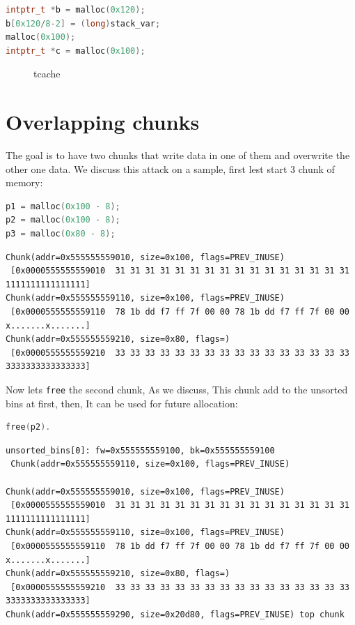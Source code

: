 \documentclass{masterthesis}
\newcommand*\tch{tcache}
\newcommand*\ub{unsorted bins}
\begin{document}
\begin{lstlisting}[language=c,frame=tlrb]
intptr_t *b = malloc(0x120);
b[0x120/8-2] = (long)stack_var;
malloc(0x100);
intptr_t *c = malloc(0x100);
\end{lstlisting}

 \begin{figure}[h!]
 \caption{\tch{}}
 \label{fig:gdb12}
\end{figure}


\section{ Overlapping chunks}
The goal is to have two chunks that write data in one of them and overwrite the other one data. We discuss this attack on a sample, first lest start 3 chunk of memory:

\begin{lstlisting}[language=c,frame=tlrb]
p1 = malloc(0x100 - 8);
p2 = malloc(0x100 - 8);
p3 = malloc(0x80 - 8);
\end{lstlisting}

\begin{lstlisting}[frame=tlrb]
Chunk(addr=0x555555559010, size=0x100, flags=PREV_INUSE)
 [0x0000555555559010  31 31 31 31 31 31 31 31 31 31 31 31 31 31 31 31 1111111111111111]
Chunk(addr=0x555555559110, size=0x100, flags=PREV_INUSE)
 [0x0000555555559110  78 1b dd f7 ff 7f 00 00 78 1b dd f7 ff 7f 00 00 x.......x.......]
Chunk(addr=0x555555559210, size=0x80, flags=)
 [0x0000555555559210  33 33 33 33 33 33 33 33 33 33 33 33 33 33 33 33 3333333333333333]
\end{lstlisting}

Now lets \lstinline{free} the second chunk, As we discuss, This chunk add to the \ub{} at first, then, It can be used for future allocation:

\begin{lstlisting}[language=c,frame=tlrb]
free(p2).
\end{lstlisting}

\begin{lstlisting}[frame=tlrb]
unsorted_bins[0]: fw=0x555555559100, bk=0x555555559100
 Chunk(addr=0x555555559110, size=0x100, flags=PREV_INUSE)

Chunk(addr=0x555555559010, size=0x100, flags=PREV_INUSE)
 [0x0000555555559010  31 31 31 31 31 31 31 31 31 31 31 31 31 31 31 31 1111111111111111]
Chunk(addr=0x555555559110, size=0x100, flags=PREV_INUSE)
 [0x0000555555559110  78 1b dd f7 ff 7f 00 00 78 1b dd f7 ff 7f 00 00 x.......x.......]
Chunk(addr=0x555555559210, size=0x80, flags=)
 [0x0000555555559210  33 33 33 33 33 33 33 33 33 33 33 33 33 33 33 33 3333333333333333]
Chunk(addr=0x555555559290, size=0x20d80, flags=PREV_INUSE) top chunk
\end{lstlisting}
\end{document}
